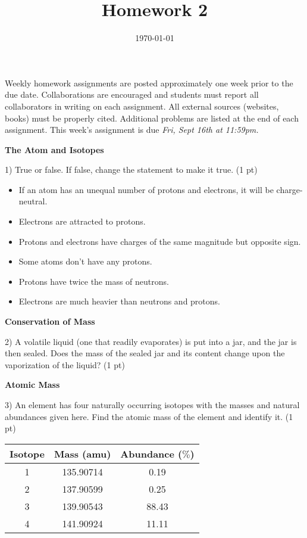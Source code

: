 \documentclass[12pt]{article}
\title{\textbf{Homework 2}}
\date{\vspace{-2em}\today}
\begin{document}
\maketitle 

Weekly homework assignments are posted approximately one week prior to the
due date. Collaborations are encouraged and students must report all collaborators
in writing on each assignment. All external sources (websites, books) must be
properly cited. Additional problems are listed at the end of each assignment.
This week's assignment is due \textit{Fri, Sept 16th at 11:59pm.}

\textbf{The Atom and Isotopes}

1) True or false. If false, change the statement to make it true. (1 pt)

\begin{itemize}
\item If an atom has an unequal number of protons and electrons, it will be
  charge-neutral.
\item Electrons are attracted to protons.
\item Protons and electrons have charges of the same magnitude but opposite
  sign.
\item Some atoms don't have any protons.
\item Protons have twice the mass of neutrons.
\item Electrons are much heavier than neutrons and protons.
\end{itemize}

\vspace{1in}

\textbf{Conservation of Mass}

2) A volatile liquid (one that readily evaporates) is put into a jar, and the
jar is then sealed. Does the mass of the sealed jar and its content change
upon the vaporization of the liquid? (1 pt)

\pagebreak

\textbf{Atomic Mass}

3) An element has four naturally occurring isotopes with the masses and natural
abundances given here. Find the atomic mass of the element and identify it. (1 pt)
\begin{table}[hbpt]
  \begin{tabular}{ccc}
    Isotope & Mass (amu) & Abundance ($\%$) \\
    \hline
    1 & 135.90714 & 0.19 \\
    2 & 137.90599 & 0.25 \\
    3 & 139.90543 & 88.43\\
    4 & 141.90924 & 11.11
  \end{tabular}
\end{table}
\end{document}

